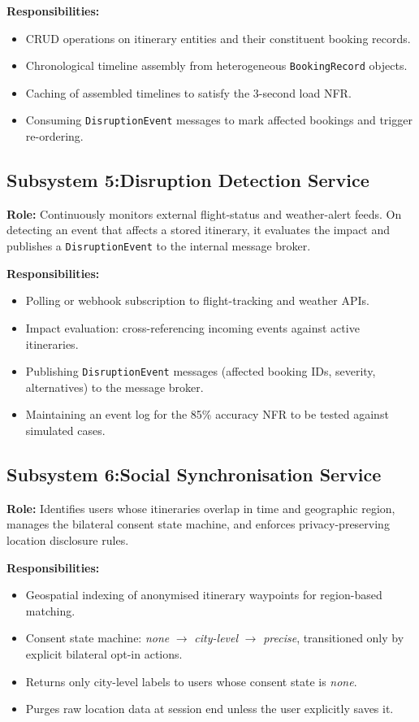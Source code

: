 \documentclass[12pt,a4paper]{article}
\begin{document}
\textbf{Responsibilities:}
\begin{itemize}[noitemsep]
  \item CRUD operations on itinerary entities and their constituent booking records.
  \item Chronological timeline assembly from heterogeneous \texttt{BookingRecord} objects.
  \item Caching of assembled timelines to satisfy the 3-second load NFR.
  \item Consuming \texttt{DisruptionEvent} messages to mark affected bookings and trigger
        re-ordering.
\end{itemize}

\subsection{Subsystem 5:Disruption Detection Service}

\textbf{Role:} Continuously monitors external flight-status and weather-alert feeds. On detecting
an event that affects a stored itinerary, it evaluates the impact and publishes a
\texttt{DisruptionEvent} to the internal message broker.

\textbf{Responsibilities:}
\begin{itemize}[noitemsep]
  \item Polling or webhook subscription to flight-tracking and weather APIs.
  \item Impact evaluation: cross-referencing incoming events against active itineraries.
  \item Publishing \texttt{DisruptionEvent} messages (affected booking IDs, severity, alternatives)
        to the message broker.
  \item Maintaining an event log for the 85\% accuracy NFR to be tested against simulated cases.
\end{itemize}

\subsection{Subsystem 6:Social Synchronisation Service}

\textbf{Role:} Identifies users whose itineraries overlap in time and geographic region, manages
the bilateral consent state machine, and enforces privacy-preserving location disclosure rules.

\textbf{Responsibilities:}
\begin{itemize}[noitemsep]
  \item Geospatial indexing of anonymised itinerary waypoints for region-based matching.
  \item Consent state machine: \textit{none} $\to$ \textit{city-level} $\to$ \textit{precise},
        transitioned only by explicit bilateral opt-in actions.
  \item Returns only city-level labels to users whose consent state is \textit{none}.
  \item Purges raw location data at session end unless the user explicitly saves it.
\end{itemize}
\end{document}
